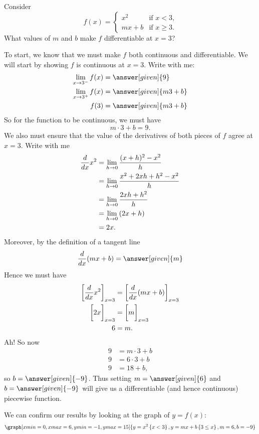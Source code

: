 \documentclass{ximera}
\begin{document}
\begin{example}
  Consider
  \[
  f(x) = \begin{cases}
          x^2 &\text{if $x<3$,}\\
          mx+b &\text{if $x\ge 3$.}
         \end{cases}
  \]
  What values of $m$ and $b$ make $f$ differentiable at $x=3$?
  \begin{explanation}
    To start, we know that we must make $f$ both continuous and
    differentiable. We will start by showing $f$ is continuous at
    $x=3$. Write with me:
    \begin{align*}
      \lim_{x\to 3^-} f(x) &= \answer[given]{9}\\
      \lim_{x\to 3^+} f(x) &= \answer[given]{m 3 + b}\\
      f(3) &= \answer[given]{m 3 + b}
    \end{align*}
    So for the function to be continuous, we must have
    \[
    m\cdot 3 + b =9.
    \]
    We also must ensure that the value of the derivatives of both
    pieces of $f$ agree at $x=3$. Write with me
    \begin{align*}
      \frac{d}{\mathop{}\!d x} x^2 &= \lim_{h\to 0}\frac{(x+h)^2-x^2}{h}\\
      &= \lim_{h\to 0}\frac{x^2 + 2xh + h^2 - x^2}{h}\\
      &= \lim_{h\to 0}\frac{2xh + h^2}{h}\\
      &= \lim_{h\to 0}\left(2x + h\right)\\
      &=2x.
    \end{align*}
    Moreover, by the definition of a tangent line
    \[
    \ddx(mx+ b) = \answer[given]{m}
    \]
    Hence we must have
    \begin{align*}
      \bigg[ \frac{d}{\mathop{}\!d x} x^2 \bigg]_{x=3} &= \bigg[ \frac{d}{\mathop{}\!d x}(mx+b) \bigg]_{x=3}\\
      \bigg[ 2x \bigg]_{x=3} &= \bigg[ m \bigg]_{x=3}\\
      6 &= m.
    \end{align*}
    Ah! So now
    \begin{align*}
      9 &= m\cdot 3 + b\\
      9 &= 6\cdot 3 + b\\
      9 &= 18 + b,
    \end{align*}
    so $b=\answer[given]{-9}$. Thus setting $m=\answer[given]{6}$ and
    $b=\answer[given]{-9}$ will give us a differentiable (and hence
    continuous) piecewise function.
    \begin{onlineOnly}
      We can confirm our results by looking at the graph of $y=f(x)$:
      \[
      \graph[xmin=0,xmax=6,ymin=-1,ymax=15]{y=x^2\left\{x<3\right\},y=mx+b\left\{3 \leq x\right\},m=6,b=-9} 
      \]
    \end{onlineOnly}
  \end{explanation}
\end{example}
\end{document}
